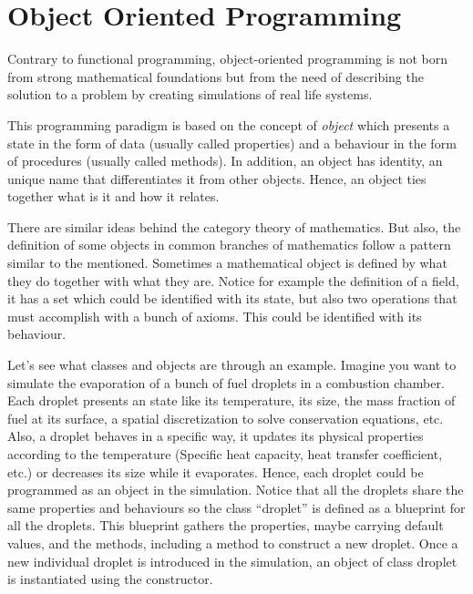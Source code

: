 \newpage 
    \section{Object Oriented Programming}

Contrary to functional programming, object-oriented programming is not born 
from strong mathematical foundations but from the need of describing the solution to a problem 
by creating simulations of real life systems.

This programming paradigm is based on the concept of \textit{object} which presents 
a state in the form of data (usually called properties) and 
a behaviour in the form of procedures (usually called methods).
In addition, an object has identity, an unique name that differentiates it from other objects. 
Hence, an object ties together what is it and how it relates.

There are similar ideas behind the category theory of mathematics.
But also, the definition of some objects in common branches of mathematics follow a pattern similar to the mentioned. 
Sometimes a mathematical object is defined by what they do together with what they are. 
Notice for example the definition of a field, it has a set which could be identified with 
its state, but also two operations that must accomplish with a bunch of axioms. 
This could be identified with its behaviour. 

Let's see what classes and objects are through an example. 
Imagine you want to simulate the evaporation of a bunch of fuel droplets in a combustion chamber. 
Each droplet presents an state like its temperature, its size, the mass fraction of fuel at its surface, a spatial discretization to solve conservation equations, etc.
Also, a droplet behaves in a specific way, it updates its physical properties according to the temperature (Specific heat capacity, heat transfer coefficient, etc.) or decreases its size while it evaporates.
Hence, each droplet could be programmed as an object in the simulation. 
Notice that all the droplets share the same properties and behaviours so the class ``droplet'' 
is defined as a blueprint for all the droplets.
This blueprint gathers the properties, maybe carrying default values, and the methods, including a method to construct a new droplet. 
Once a new individual droplet is introduced in the simulation, an object of class droplet is instantiated using the constructor. 

